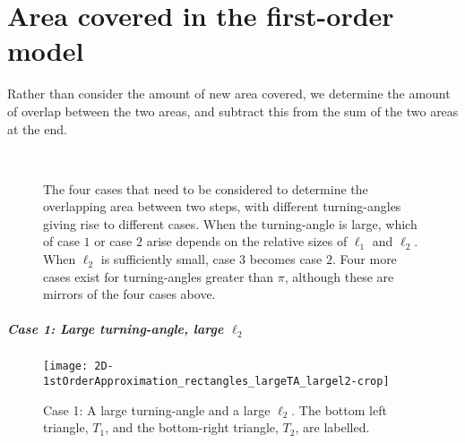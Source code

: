 \chapter{Area covered in the first-order model\label{app:area}}
\label{sec:2dmodel:1starea}
Rather than consider the amount of new area covered, we determine the amount of overlap between the two areas, and subtract this from the sum of the two areas at the end.
\begin{figure}[h!]
	\centering
	\hfill
	\\
	\hfill
	\caption[The four different cases for the turning-angle that we consider when determining the area of overlap]{The four cases that need to be considered to determine the overlapping area between two steps, with different turning-angles giving rise to different cases. When the turning-angle is large, which of case $1$ or case $2$ arise depends on the relative sizes of $\ell_1$ and $\ell_2$. When $\ell_2$ is sufficiently small, case $3$ becomes case $2$. Four more cases exist for turning-angles greater than $\pi$, although these are mirrors of the four cases above.}\label{fig:2d_model:firstorder:fourcasesappendix}
\end{figure}

\FloatBarrier
\paragraph{Case 1: Large turning-angle, large $\ell_2$}
\FloatBarrier
\begin{figure}[h!]
	\centering
	\texttt{[image: 2D-1stOrderApproximation\_rectangles\_largeTA\_largel2-crop]}
	\caption[Case 1: A large turning angle and large step]{Case 1: A large turning-angle and a large $\ell_2$. The bottom left triangle, $T_1$, and the bottom-right triangle, $T_2$, are labelled.}
	\label{fig:2d_model:firstorder:case1}
\end{figure}

